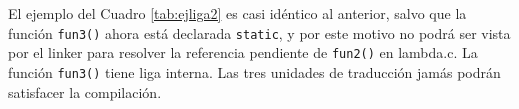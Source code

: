 \begin{ejemplo}
\begin{comment}
\begin{table}
\centering	
\begin{tabular}{l|l|l}
\hline
alfa.c & beta.c & gamma.c \\
\hline
\begin{codecell}
int main()
{
	fun1();
	fun2();
}
\end{codecell}
&
\begin{codecell}
int fun1()
{
	...
}
\end{codecell}
&
\begin{codecell}
int fun2()
{
	...
	fun3();
	....
}
int fun3()
{
	...
}
\end{codecell}
\\
\end{tabular}
 \caption{Liga de las variables}
 \label{tab:ejliga} 
\end{table}
\end{comment}
\end{ejemplo}


\begin{ejemplo}
El ejemplo del Cuadro \ref{tab:ejliga2} es casi idéntico al anterior, salvo que la función \lstinline{fun3()} ahora está declarada \lstinline{static}, y por este motivo no podrá ser vista por el linker para resolver la referencia pendiente de \lstinline{fun2()} en
lambda.c. La función \lstinline{fun3()} tiene liga interna. Las tres unidades de traducción jamás podrán satisfacer la compilación.

\begin{comment}
\begin{table}
\centering	
\begin{tabular}{l|l|l}
\hline
iota.c & kappa.c & lambda.c \\
\hline
\begin{codecell}
int main()
{
	fun1();
	fun2();
}
\end{codecell}
&
\begin{codecell}
int fun1()
{
	...
}
static int fun3()
{
	...
}
\end{codecell}
&
\begin{codecell}
int fun2()
{
	...
	fun3();
	...
}
\end{codecell}
\\
\end{tabular}
 \caption{Liga de las variables}
 \label{tab:ejliga2} 
\end{table}
\end{comment}
\end{ejemplo}


